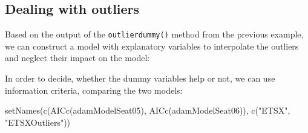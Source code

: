 \documentclass[
]{book}
\newenvironment{Shaded}{\begin{snugshade}}{\end{snugshade}}
\newcommand{\AttributeTok}[1]{\textcolor[rgb]{0.77,0.63,0.00}{#1}}
\newcommand{\CommentTok}[1]{\textcolor[rgb]{0.56,0.35,0.01}{\textit{#1}}}
\newcommand{\DecValTok}[1]{\textcolor[rgb]{0.00,0.00,0.81}{#1}}
\newcommand{\FunctionTok}[1]{\textcolor[rgb]{0.00,0.00,0.00}{#1}}
\newcommand{\NormalTok}[1]{#1}
\newcommand{\OtherTok}[1]{\textcolor[rgb]{0.56,0.35,0.01}{#1}}
\newcommand{\SpecialCharTok}[1]{\textcolor[rgb]{0.00,0.00,0.00}{#1}}
\newcommand{\StringTok}[1]{\textcolor[rgb]{0.31,0.60,0.02}{#1}}
\theoremstyle{definition}
\theoremstyle{definition}
\theoremstyle{definition}
\theoremstyle{definition}
\theoremstyle{remark}
\begin{document}
\hypertarget{dealing-with-outliers}{%
\subsection{Dealing with outliers}\label{dealing-with-outliers}}

Based on the output of the \texttt{outlierdummy()} method from the previous example, we can construct a model with explanatory variables to interpolate the outliers and neglect their impact on the model:

\begin{Shaded}
\end{Shaded}

In order to decide, whether the dummy variables help or not, we can use information criteria, comparing the two models:

\begin{Shaded}
\begin{Highlighting}[]
\FunctionTok{setNames}\NormalTok{(}\FunctionTok{c}\NormalTok{(}\FunctionTok{AICc}\NormalTok{(adamModelSeat05), }\FunctionTok{AICc}\NormalTok{(adamModelSeat06)),}
         \FunctionTok{c}\NormalTok{(}\StringTok{"ETSX"}\NormalTok{, }\StringTok{"ETSXOutliers"}\NormalTok{))}
\end{Highlighting}
\end{Shaded}
\end{document}

